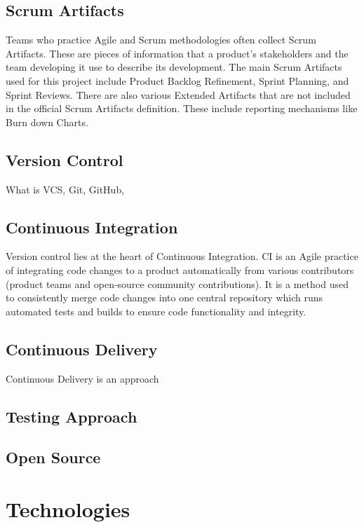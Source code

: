 \documentclass{article}
\begin{document}
\subsection{Scrum Artifacts}
Teams who practice Agile and Scrum methodologies often collect Scrum Artifacts. These are pieces of information that a product's stakeholders and the team developing it use to describe its development. The main Scrum Artifacts used for this project include Product Backlog Refinement, Sprint Planning, and Sprint Reviews. There are also various Extended Artifacts that are not included in the official Scrum Artifacts definition. These include reporting mechanisms like Burn down Charts.



\subsection{Version Control}
What is VCS, Git, GitHub, 



\subsection{Continuous Integration}
Version control lies at the heart of Continuous Integration. CI is an Agile practice of integrating code changes to a product automatically from various contributors (product teams and open-source community contributions). It is a method used to consistently merge code changes into one central repository which runs automated tests and builds to ensure code functionality and integrity.   



\subsection{Continuous Delivery}
Continuous Delivery is an approach 



\subsection{Testing Approach}



\subsection{Open Source}



\section{Technologies}
\end{document}
